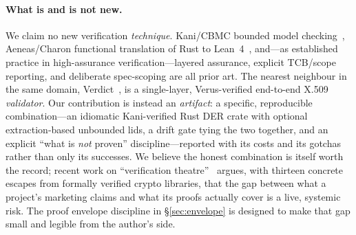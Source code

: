 \documentclass[10pt,twocolumn]{article}
\begin{document}
\paragraph{What is and is not new.}
We claim no new verification \emph{technique}. Kani/CBMC bounded model
checking~\cite{kani}, Aeneas/Charon functional translation of Rust to
Lean~4~\cite{aeneas}, and---as established practice in high-assurance
verification---layered assurance, explicit TCB/scope reporting, and deliberate
spec-scoping are all prior art. The nearest neighbour in the same domain, Verdict~\cite{verdict},
is a single-layer, Verus-verified end-to-end X.509 \emph{validator}. Our
contribution is instead an \emph{artifact}: a specific, reproducible
combination---an idiomatic Kani-verified Rust DER crate with optional
extraction-based unbounded lids, a drift gate tying the two together, and an
explicit ``what is \emph{not} proven'' discipline---reported with its costs
and its gotchas rather than only its successes. We believe the honest
combination is itself worth the record; recent work on ``verification
theatre''~\cite{theatre} argues, with thirteen concrete escapes from
formally verified crypto libraries, that the gap between what a project's
marketing claims and what its proofs actually cover is a live, systemic risk.
The proof envelope discipline in \S\ref{sec:envelope} is designed to make
that gap small and legible from the author's side.
\end{document}
